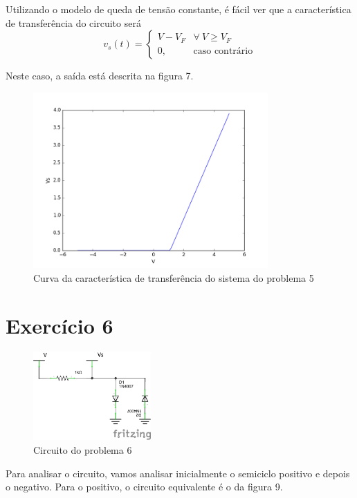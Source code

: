 \documentclass[12pt, a4paper, twoside]{article}
\begin{document}
Utilizando o modelo de queda de tensão constante, é fácil ver que a característica
de transferência do circuito será
\begin{equation}
    v_s(t) =
    \begin{cases}
        V - V_F & \forall\ V \geq V_F \\
        0, & \text{caso contrário}
    \end{cases}
\end{equation}

Neste caso, a saída está descrita na figura 7.

\begin{figure}[H]
    \centering
    \includegraphics[width=0.8\textwidth]{figs/rel3/ex5.png}
    \caption{Curva da característica de transferência do sistema do problema 5}
\end{figure}

\section{Exercício 6}

\begin{figure}[H]
    \centering
    \includegraphics[width=0.4\textwidth]{figs/rel3/c3.png}
    \caption{Circuito do problema 6}
\end{figure}

Para analisar o circuito, vamos analisar inicialmente o semiciclo positivo e depois
o negativo. Para o positivo, o circuito equivalente é o da figura 9.
\end{document}
